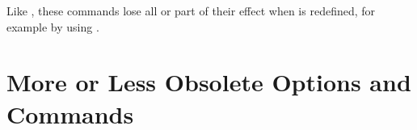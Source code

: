 Like , these
commands lose all or part of their effect when 
is redefined, for example by using
.%
\EndIndexGroup


\section{More or Less Obsolete Options and Commands}

%
\EndIndexGroup

\endinput


